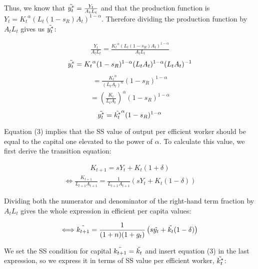 \documentclass[11pt]{article} %
\begin{document}
\par Thus, we know that $\Tilde{y_t^*}=\frac{Y_t}{{A_t}{L_t}}$ and that the production function is $Y_t={K_t}^{\alpha}\left({L_t}(1-{s_R}){A_t}\right)^{1-\alpha}$. Therefore dividing the production function by $A_tL_t$ gives us $\Tilde{y_t^*}$:

\begin{align*}
    \frac{Y_t}{A_tL_t}=\frac{{K_t}^{\alpha}\left(L_t(1-{s_R})A_t\right)^{1-\alpha}}{A_tL_t}
\end{align*}
\begin{align*}
    \Tilde{y_t^*}={K_t}^{\alpha}(1-s_R)^{1-\alpha}(L_tA_t)^{1-\alpha}(L_tA_t)^{-1}
\end{align*}
\begin{align*}
    =\frac{{K_t}^\alpha}{(L_tA_t)^{\alpha}}(1-{s_R})^{1-\alpha}
\end{align*}
\begin{align*}
    =\left(\frac{{K_t}}{L_tA_t}\right)^{\alpha}(1-{s_R})^{1-\alpha}
\end{align*}
\begin{equation}
    \Tilde{y_t^*}=\Tilde{k_t^*}^{\alpha}(1-{s_R})^{1-\alpha}
\end{equation}

\par Equation (3) implies that the SS value of output per efficient worker should be equal to the capital one elevated to the power of $\alpha$. To calculate this value, we first derive the transition equation:

\begin{align*}
    K_{t+1}=sY_t+K_t(1+\delta)    
\end{align*}
\begin{align*}
    \Longleftrightarrow\frac{K_{t+1}}{{L_{t+1}}{A_{t+1}}}=\frac{1}{{{L_{t+1}}{A_{t+1}}}}\left(sY_t+K_t(1-\delta)\right)
\end{align*}

\par Dividing both the numerator and denominator of the right-hand term fraction by $A_tL_t$ gives the whole expression in efficient per capita values:

\begin{align*}
    \Longleftrightarrow\Tilde{k_{t+1}}=\frac{1}{(1+n)(1+g_t)}\left(s\Tilde{y_t}+\Tilde{k_t}(1-\delta)\right)
\end{align*}

\par We set the SS condition for capital $\Tilde{k_{t+1}}=\Tilde{k_{t}}$ and insert equation (3) in the last expression, so we express it in terms of SS value per efficient worker, $\Tilde{k_{t}^*}$:
\end{document}
